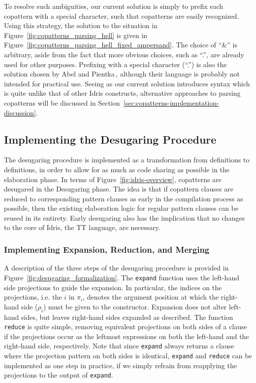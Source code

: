 To resolve such ambiguities, our current solution is simply to prefix each
copattern with a special character, such that copatterns are easily
recognized. Using this strategy, the solution to the situation in
Figure~\ref{fig:copatterns_parsing_hell} is given in
Figure~\ref{fig:copatterns_parsing_hell_fixed_ampersand}. The choice of ``\&''
is arbitrary, aside from the fact that more obvious choices, such as ``.'', are
already used for other purposes. Prefixing with a special character (``.'') is also
the solution chosen by Abel and Pientka\,\citep{Abel13Wellfounded}, although
their language is probably not intended for practical use. Seeing as our current
solution introduces syntax which is quite unlike that of other Idris
constructs, alternative approaches to parsing copatterns will be discussed in
Section~\ref{sec:copatterns-implementation-discussion}.

\subsection{Implementing the Desugaring Procedure}
The desugaring procedure is implemented as a transformation from \IdrisM{} definitions
to \IdrisM{} definitions, in order to allow for as much as code sharing as possible in
the elaboration phase. In terms of Figure~\ref{fig:idris-overview}, copatterns
are desugared in the Desugaring phase. The idea is that if copattern clauses are
reduced to corresponding pattern clauses as early in the compilation process as
possible, then the existing elaboration logic for regular pattern clauses can be
reused in its entirety. Early desugaring also has the implication that no
changes to the core of Idris, the TT language, are necessary.

\subsubsection{Implementing Expansion, Reduction, and Merging}
A description of the three steps of the desugaring procedure is provided in
Figure~\ref{fig:desugaring_formalization}. The \texttt{expand} function uses the
left-hand side projections to guide the expansion. In particular, the indices on
the projections, i.e. the $i$ in $\pi_i$, denotes the argument position at which
the right-hand side ($\rho_i$) must be given to the constructor. Expansion does
not alter left-hand sides, but leaves right-hand sides expanded as
described. The function \texttt{reduce} is quite simple, removing equivalent
projections on both sides of a clause if the projections occur as the leftmost
expressions on both the left-hand and the right-hand side, respectively. Note that since
\texttt{expand} always returns a clause where the projection pattern on both
sides is identical, \texttt{expand} and \texttt{reduce} can be implemented as
one step in practice, if we simply refrain from reapplying the projections to the
output of \texttt{expand}.

